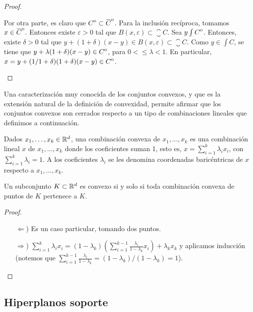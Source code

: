 \begin{proof}
\begin{enumerate}
        Por otra parte, es claro que $\interior{C} \subset \interior{\closure{C}}$. Para la inclusión recíproca, tomamos $x \in \interior{\closure{C}}$. Entonces existe $\varepsilon > 0$ tal que $B(x,\varepsilon) \subset \closure{C}$. Sea $y \int {\kern0ptC}^{\mathrm{o}}$. Entonces, existe $\delta > 0$ tal que $y + (1+\delta)(x-y) \in B(x,\varepsilon) \subset \closure{C}$. Como $y \in \int{C}$, se tiene que $y + \lambda(1+\delta)(x-y) \in {\kern0ptC}^{\mathrm{o}}$, para $0 <\le \lambda < 1$. En particular, $x = y + (1/1+\delta)(1+\delta)(x-y) \in {\kern0ptC}^{\mathrm{o}}$. 
    \end{enumerate}
\end{proof}

Una caracterización muy conocida de los conjuntos convexos, y que es la extensión natural de la definición de convexidad, permite afirmar que los conjuntos convexos son cerrados respecto a un tipo de combinaciones lineales que definimos a continuación.

\begin{definition}
    Dados $x_1,\dots,x_k \in \mathbb{R}^d$, una combinación convexa de $x_1,\dots,x_k$ es una combinación lineal $x$ de $x_1,\dots,x_k$ donde los coeficientes suman 1, esto es, $x = \sum_{i=1}^k \lambda_ix_i$, con $\sum_{i=1}^k \lambda_i = 1$. A los coeficientes $\lambda_i$ se les denomina coordenadas baricéntricas de $x$ respecto a $x_1,\dots,x_k$.
\end{definition}

\begin{prop}
    Un subconjunto $K \subset \mathbb{R}^d$ es convexo si y solo si toda combinación convexa de puntos de $K$ pertenece a $K$.
\end{prop}
\begin{proof}~
 \begin{enumerate}
     \item[$\Leftarrow$)] Es un caso particular, tomando dos puntos.

     \item[$\Rightarrow$)] $\sum_{i=1}^k \lambda_ix_i = (1-\lambda_k)\left( \sum_{i=1}^{k-1}\frac{\lambda_i}{1-\lambda_k}x_i \right) + \lambda_kx_k$ y aplicamos inducción (notemos que $\sum_{i=1}^{k-1}\frac{\lambda_i}{1-\lambda_k} = (1-\lambda_k)/(1-\lambda_k) = 1$).
\end{enumerate}
\end{proof}

\subsection{Hiperplanos soporte}

